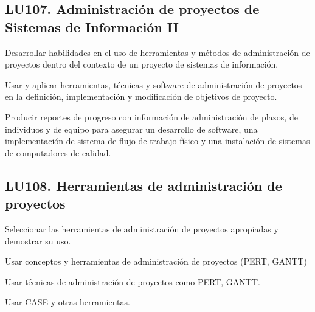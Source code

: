 \subsection{LU107. Administración de proyectos  de Sistemas de Información II}\label{sec:LU107}
\begin{LearningUnit}
\begin{LUGoal}
\item Desarrollar habilidades en el uso de herramientas y métodos de administración de proyectos dentro del contexto de un proyecto de sistemas de información.
\end{LUGoal}

\begin{LUObjective}
\item Usar y aplicar herramientas, técnicas y software de administración de proyectos en la definición, implementación y modificación de objetivos de proyecto.
\item Producir reportes de progreso con información de administración de plazos, de individuos y de equipo para asegurar un desarrollo de software, una implementación de sistema de flujo de trabajo físico y una instalación de sistemas de computadores de calidad.
\end{LUObjective}
\end{LearningUnit}

\subsection{LU108. Herramientas de administración de proyectos}\label{sec:LU108}
\begin{LearningUnit}
\begin{LUGoal}
\item Seleccionar las herramientas de administración de proyectos apropiadas y demostrar su uso.
\end{LUGoal}

\begin{LUObjective}
\item Usar conceptos y herramientas de administración de proyectos  (PERT, GANTT)
\item Usar técnicas de administración de proyectos como PERT, GANTT.
\item Usar CASE y otras herramientas.
\end{LUObjective}
\end{LearningUnit}

